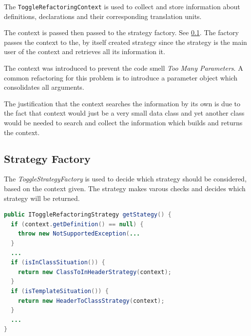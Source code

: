 The \texttt{ToggleRefactoringContext} is used to collect and store information 
about definitions, declarations and their corresponding translation units.

The context is passed then passed to the strategy factory. See \ref{factory}.
The factory passes the context to the, by itself created strategy since the
strategy is the main user of the context and retrieves all its information it.

The context was introduced to prevent the code smell \textit{Too Many 
Parameters}\cite{cwiki}. A common refactoring for this problem is to introduce a 
parameter object which consolidates all arguments.

The justification that the context searches the information by its own is due
to the fact that context would just be a very small data class and yet another
class would be needed to search and collect the information which builds and
returns the context.

\subsection{Strategy Factory}
\label{factory}

The \textit{ToggleStrategyFactory} is used to decide which strategy should be 
considered, based on the context given. The strategy makes varous checks
and decides which strategy will be returned.

\begin{lstlisting}[caption={IToggleRefactoringStrategy},
label={strategy}, language=Java]
public IToggleRefactoringStrategy getStategy() {
  if (context.getDefinition() == null) {
    throw new NotSupportedException(...
  }
  ...
  if (isInClassSituation()) {
    return new ClassToInHeaderStrategy(context);
  }
  if (isTemplateSituation()) {
    return new HeaderToClassStrategy(context);
  }
  ...
}
\end{lstlisting}

